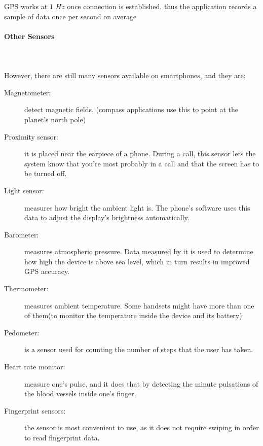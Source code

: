\documentclass[tesi]{subfiles}
\begin{document}
\noindent GPS works at $1$ $Hz$ once connection is established, thus the application records a sample of data once per second on average




\clearpage
\paragraph{{\Large Other Sensors}}\leavevmode\\\\
However, there are still many sensors available on smartphones, and they are:
\begin{description}
\item[Magnetometer:] detect magnetic fields. (compass applications use this to point at the planet's north pole)
\item[Proximity sensor:] it is placed near the earpiece of a phone. During a call, this sensor lets the system know that you're most probably in a call and that the screen has to be turned off.
\item[Light sensor:] measures how bright the ambient light is. The phone's software uses this data to adjust the display's brightness automatically.
\item[Barometer:] measures atmospheric pressure. Data measured by it is used to determine how high the device is above sea level, which in turn results in improved GPS accuracy. 
\item[Thermometer:] measures ambient temperature. Some handsets might have more than one of them(to monitor the temperature inside the device and its battery)
\item[Pedometer:] is a sensor used for counting the number of steps that the user has taken.
\item[Heart rate monitor:] measure one's pulse, and it does that by detecting the minute pulsations of the blood vessels inside one's finger.
\item[Fingerprint sensors:] the sensor is most convenient to use, as it does not require swiping in order to read fingerprint data.
\end{description}
\clearpage
\end{document}
